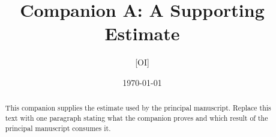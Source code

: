 \documentclass[11pt]{article}
\title{Companion A: A Supporting Estimate}
\author{[OI]}
\date{\today}
\begin{document}
\maketitle

\begin{abstract}
This companion supplies the estimate used by the principal manuscript.
Replace this text with one paragraph stating what the companion proves
and which result of the principal manuscript consumes it.
\end{abstract}






\end{document}
